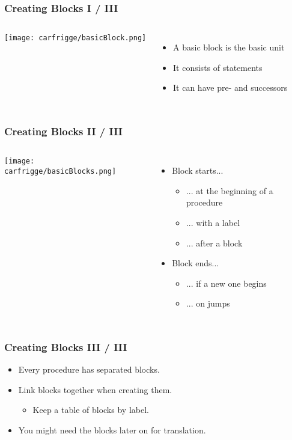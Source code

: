 \begin{frame}
    \frametitle{Creating Blocks I / III}
    \begin{columns} 
        \texttt{[image: carfrigge/basicBlock.png]} 
        \begin{itemize} 
          \item A basic block is the basic unit 
          \item It consists of statements
          \item It can have pre- and successors
        \end{itemize} 
    \end{columns}
\end{frame}
\begin{frame}
    \frametitle{Creating Blocks II / III}
    \begin{columns}
        \texttt{[image: carfrigge/basicBlocks.png]} 
        \begin{itemize} 
           \item Block starts...
          \begin{itemize}
          		 \item ... at the beginning of a procedure
          		\onslide<1-> \item ... with a label
          		\onslide<1-> \item ... after a block
          \end{itemize}
           \item Block ends...
          \begin{itemize}
          		 \item ... if a new one begins
          		\onslide<2-> \item ... on jumps
          \end{itemize}
        \end{itemize} 
    \end{columns}
\end{frame}
\begin{frame}
    \frametitle{Creating Blocks III / III}
        \begin{itemize} 
          \item Every procedure has separated blocks.
          \item Link blocks together when creating them.
          \begin{itemize}
          		\item Keep a table of blocks by label.
          \end{itemize}
          	\item You might need the blocks later on for translation.
        \end{itemize} 
\end{frame}

